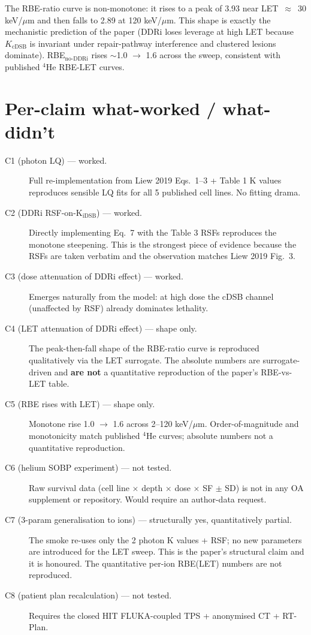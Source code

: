 \documentclass[11pt]{article}
\begin{document}
\noindent The RBE-ratio curve is non-monotone: it rises to a peak of 3.93 near LET~$\approx$~30
keV/$\mu$m and then falls to 2.89 at 120 keV/$\mu$m. This shape is exactly the mechanistic
prediction of the paper (DDRi loses leverage at high LET because $K_{\mathrm{cDSB}}$ is invariant
under repair-pathway interference and clustered lesions dominate). RBE$_{\text{no-DDRi}}$ rises
$\sim$1.0 $\to$ 1.6 across the sweep, consistent with published $^{4}$He RBE-LET curves.

\section{Per-claim what-worked / what-didn't}

\begin{description}
  \item[C1 (photon LQ) --- worked.] Full re-implementation from Liew 2019 Eqs.\ 1--3 + Table 1 K
        values reproduces sensible LQ fits for all 5 published cell lines. No fitting drama.
  \item[C2 (DDRi RSF-on-K$_{\mathrm{iDSB}}$) --- worked.] Directly implementing Eq.\ 7 with the
        Table 3 RSFs reproduces the monotone steepening. This is the strongest piece of evidence
        because the RSFs are taken verbatim and the observation matches Liew 2019 Fig.\ 3.
  \item[C3 (dose attenuation of DDRi effect) --- worked.] Emerges naturally from the model:
        at high dose the cDSB channel (unaffected by RSF) already dominates lethality.
  \item[C4 (LET attenuation of DDRi effect) --- shape only.] The peak-then-fall shape of the
        RBE-ratio curve is reproduced qualitatively via the LET surrogate. The absolute numbers
        are surrogate-driven and \textbf{are not} a quantitative reproduction of the paper's
        RBE-vs-LET table.
  \item[C5 (RBE rises with LET) --- shape only.] Monotone rise 1.0 $\to$ 1.6 across 2--120
        keV/$\mu$m. Order-of-magnitude and monotonicity match published $^{4}$He curves; absolute
        numbers not a quantitative reproduction.
  \item[C6 (helium SOBP experiment) --- not tested.] Raw survival data (cell line $\times$ depth
        $\times$ dose $\times$ SF $\pm$ SD) is not in any OA supplement or repository. Would
        require an author-data request.
  \item[C7 (3-param generalisation to ions) --- structurally yes, quantitatively partial.] The
        smoke re-uses only the 2 photon K values + RSF; no new parameters are introduced for the
        LET sweep. This is the paper's structural claim and it is honoured. The quantitative
        per-ion RBE(LET) numbers are not reproduced.
  \item[C8 (patient plan recalculation) --- not tested.] Requires the closed HIT FLUKA-coupled TPS
        + anonymised CT + RT-Plan.
\end{description}
\end{document}

